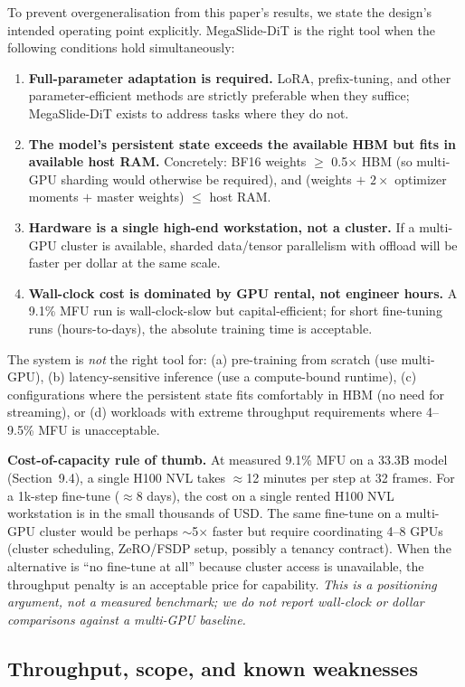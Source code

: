 \documentclass[11pt, letterpaper]{article}
\begin{document}
To prevent overgeneralisation from this paper's results, we state the design's intended operating point explicitly. MegaSlide-DiT is the right tool when the following conditions hold simultaneously:
\begin{enumerate}
    \item \textbf{Full-parameter adaptation is required.} LoRA, prefix-tuning, and other parameter-efficient methods are strictly preferable when they suffice; MegaSlide-DiT exists to address tasks where they do not.
    \item \textbf{The model's persistent state exceeds the available HBM but fits in available host RAM.} Concretely: BF16 weights $\geq$ 0.5$\times$ HBM (so multi-GPU sharding would otherwise be required), and (weights $+$ $2\times$ optimizer moments $+$ master weights) $\leq$ host RAM.
    \item \textbf{Hardware is a single high-end workstation, not a cluster.} If a multi-GPU cluster is available, sharded data/tensor parallelism with offload will be faster per dollar at the same scale.
    \item \textbf{Wall-clock cost is dominated by GPU rental, not engineer hours.} A 9.1\% MFU run is wall-clock-slow but capital-efficient; for short fine-tuning runs (hours-to-days), the absolute training time is acceptable.
\end{enumerate}
The system is \emph{not} the right tool for: (a) pre-training from scratch (use multi-GPU), (b) latency-sensitive inference (use a compute-bound runtime), (c) configurations where the persistent state fits comfortably in HBM (no need for streaming), or (d) workloads with extreme throughput requirements where 4--9.5\% MFU is unacceptable.

\textbf{Cost-of-capacity rule of thumb.} At measured 9.1\% MFU on a 33.3B model (Section~9.4), a single H100 NVL takes $\approx$12 minutes per step at 32 frames. For a 1k-step fine-tune ($\approx$8 days), the cost on a single rented H100 NVL workstation is in the small thousands of USD. The same fine-tune on a multi-GPU cluster would be perhaps $\sim$5$\times$ faster but require coordinating 4--8 GPUs (cluster scheduling, ZeRO/FSDP setup, possibly a tenancy contract). When the alternative is ``no fine-tune at all'' because cluster access is unavailable, the throughput penalty is an acceptable price for capability. \emph{This is a positioning argument, not a measured benchmark; we do not report wall-clock or dollar comparisons against a multi-GPU baseline.}

\subsection{Throughput, scope, and known weaknesses}
\end{document}
